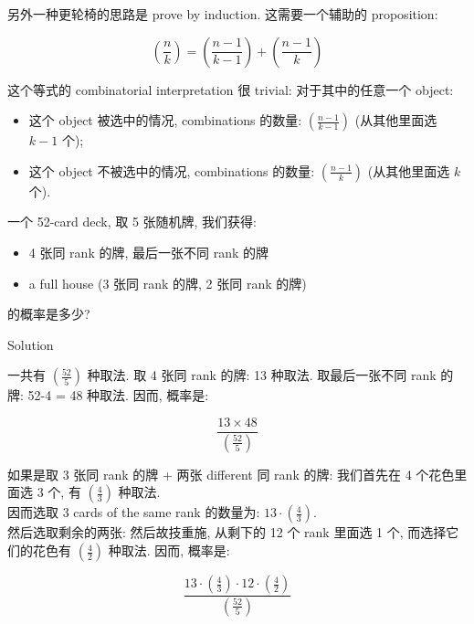 \documentclass{qlnotes-export}
\begin{document}
另外一种更轮椅的思路是 prove by induction. 这需要一个辅助的 proposition:

\begin{proposition}\label{prop-01-combinatorics-prob-space-proposition-003}

\[\left( \frac{n}{k} \right) = \left( \frac{n - 1}{k - 1} \right) + \left( \frac{n - 1}{k} \right)\]

\end{proposition}

这个等式的 combinatorial interpretation 很 trivial: 对于其中的任意一个 object:

\begin{itemize}
\item
  这个 object 被选中的情况, combinations 的数量: \(\left( \frac{n - 1}{k - 1} \right)\) (从其他里面选 \(k - 1\) 个);
\item
  这个 object 不被选中的情况, combinations 的数量: \(\left( \frac{n - 1}{k} \right)\) (从其他里面选 \(k\) 个).
\end{itemize}

\begin{example}\label{ex-01-combinatorics-prob-space-example-002}

一个 52-card deck, 取 5 张随机牌, 我们获得:

\begin{itemize}
\item
  4 张同 rank 的牌, 最后一张不同 rank 的牌
\item
  a full house (3 张同 rank 的牌, 2 张同 rank 的牌)
\end{itemize}

的概率是多少?

\end{example}

\begin{qlsolution}{Solution}

一共有 \(\left( \frac{52}{5} \right)\) 种取法. 取 4 张同 rank 的牌: 13 种取法. 取最后一张不同 rank 的牌: 52-4 = 48 种取法. 因而, 概率是:

\[\frac{13 \times 48}{\left( \frac{52}{5} \right)}\]

如果是取 3 张同 rank 的牌 + 两张 different 同 rank 的牌: 我们首先在 4 个花色里面选 3 个, 有 \(\left( \frac{4}{3} \right)\) 种取法.\\
因而选取 3 cards of the same rank 的数量为: \(13 \cdot \left( \frac{4}{3} \right)\).\\
然后选取剩余的两张: 然后故技重施, 从剩下的 12 个 rank 里面选 1 个, 而选择它们的花色有 \(\left( \frac{4}{2} \right)\) 种取法. 因而, 概率是:

\[\frac{13 \cdot \left( \frac{4}{3} \right) \cdot 12 \cdot \left( \frac{4}{2} \right)}{\left( \frac{52}{5} \right)}\]

\end{qlsolution}
\end{document}
